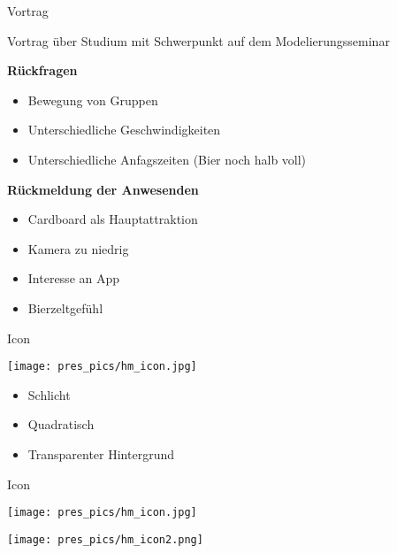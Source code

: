 
%
%

\begin{frame}{Vortrag}

Vortrag über Studium mit Schwerpunkt auf dem Modelierungsseminar

\pause

\textbf{Rückfragen}

	\begin{itemize}

		\item Bewegung von Gruppen
		\item Unterschiedliche Geschwindigkeiten
		\item Unterschiedliche Anfagszeiten (Bier noch halb voll)
		\pause
	\end{itemize}

\textbf{Rückmeldung der Anwesenden}
	\begin{itemize}

		\item Cardboard als Hauptattraktion
		\item Kamera zu niedrig
		\item Interesse an App
		\item Bierzeltgefühl

	\end{itemize}


\end{frame}

\begin{frame}{Icon}

	\begin{minipage}{0.50\textwidth}
			\texttt{[image: pres\_pics/hm\_icon.jpg]}
	\end{minipage} \hfill
	\begin{minipage}{0.48\textwidth}
		\begin{itemize}
			\item Schlicht
			\item Quadratisch
			\item Transparenter Hintergrund
		\end{itemize}
	\end{minipage}

\end{frame}

\begin{frame}{Icon}

	\begin{minipage}{0.50\textwidth}
		\texttt{[image: pres\_pics/hm\_icon.jpg]}
	\end{minipage} \hfill
	\begin{minipage}{0.48\textwidth}
		\texttt{[image: pres\_pics/hm\_icon2.png]}
	\end{minipage}

\end{frame}

